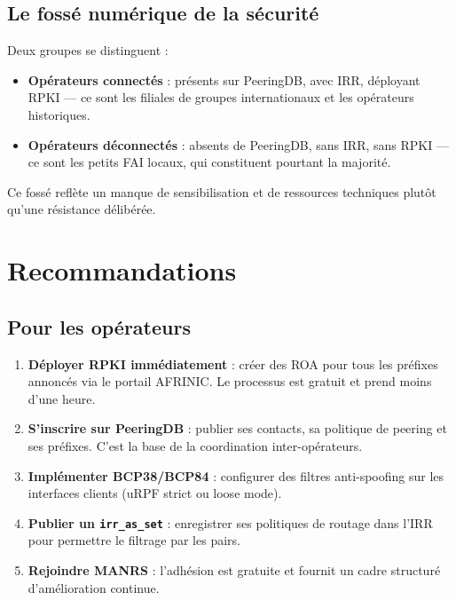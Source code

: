 \documentclass{eneam}
\begin{document}
\subsection{Le fossé numérique de la sécurité}

Deux groupes se distinguent :
\begin{itemize}
    \item \textbf{Opérateurs connectés} : présents sur PeeringDB, avec IRR, déployant RPKI --- ce sont les filiales de groupes internationaux et les opérateurs historiques.
    \item \textbf{Opérateurs déconnectés} : absents de PeeringDB, sans IRR, sans RPKI --- ce sont les petits FAI locaux, qui constituent pourtant la majorité.
\end{itemize}

Ce fossé reflète un manque de sensibilisation et de ressources techniques plutôt qu'une résistance délibérée.

\section{Recommandations}

\subsection{Pour les opérateurs}

\begin{enumerate}
    \item \textbf{Déployer RPKI immédiatement} : créer des ROA pour tous les préfixes annoncés via le portail AFRINIC. Le processus est gratuit et prend moins d'une heure.
    \item \textbf{S'inscrire sur PeeringDB} : publier ses contacts, sa politique de peering et ses préfixes. C'est la base de la coordination inter-opérateurs.
    \item \textbf{Implémenter BCP38/BCP84} : configurer des filtres anti-spoofing sur les interfaces clients (uRPF strict ou loose mode).
    \item \textbf{Publier un \texttt{irr\_as\_set}} : enregistrer ses politiques de routage dans l'IRR pour permettre le filtrage par les pairs.
    \item \textbf{Rejoindre MANRS} : l'adhésion est gratuite et fournit un cadre structuré d'amélioration continue.
\end{enumerate}
\end{document}
